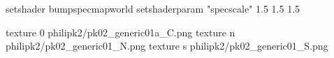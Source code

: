 setshader bumpspecmapworld
setshaderparam "specscale" 1.5 1.5 1.5

texture 0 philipk2/pk02_generic01a_C.png
texture n philipk2/pk02_generic01_N.png
texture s philipk2/pk02_generic01_S.png

